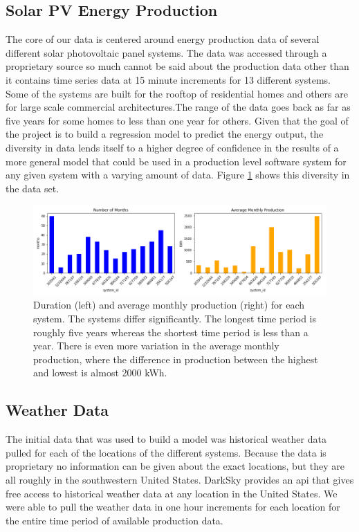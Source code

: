 \documentclass[11pt, fullpage,letterpaper]{article}
\begin{document}
\subsection{Solar PV Energy Production}
The core of our data is centered around energy production data of several different solar photovoltaic panel systems. The data was accessed through a proprietary source so much cannot be said about the production data other than it contains time series data at 15 minute increments for 13 different systems. Some of the systems are built for the rooftop of residential homes and others are for large scale commercial architectures.The range of the data goes back as far as five years for some homes to less than one year for others. Given that the goal of the project is to build a regression model to predict the energy output, the diversity in data lends itself to a higher degree of confidence in the results of a more general model that could be used in a production level software system for any given system with a varying amount of data. Figure \ref{2-1} shows this diversity in the data set.

\begin{figure}[!htb]
    \includegraphics[width=\textwidth]{../plots/regression_report/2-1}
    \caption{Duration (left) and average monthly production (right) for each system. The systems differ significantly. The longest time period is roughly five years whereas the shortest time period is less than a year. There is even more variation in the average monthly production, where the difference in production between the highest and lowest is almost 2000 kWh.}
    \label{2-1} 
\end{figure}

\subsection{Weather Data}
The initial data that was used to build a model was historical weather data pulled for each of the locations of the different systems. Because the data is proprietary no information can be given about the exact locations, but they are all roughly in the southwestern United States. DarkSky \cite{DarkSky} provides an api that gives free access to historical weather data at any location in the United States. We were able to pull the weather data in one hour increments for each location for the entire time period of available production data.
\end{document}
